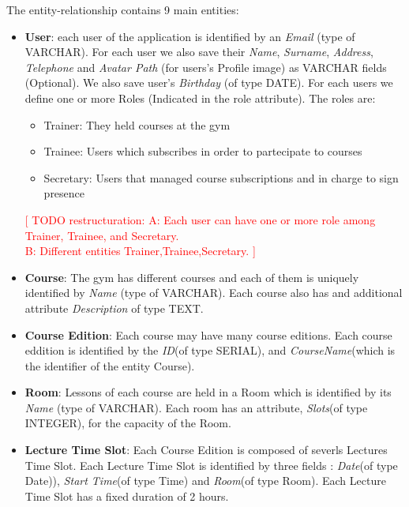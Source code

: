     The entity-relationship contains 9 main entities:
    \begin{itemize}
        \item 
        \textbf{User}: each user of the application is identified by an \textit{Email} (type of VARCHAR). 
    	For each user we also save their \textit{Name}, \textit{Surname}, \textit{Address}, \textit{Telephone} and \textit{Avatar Path} (for users's Profile image) as VARCHAR fields (Optional). We also save user's \textit{Birthday} (of type DATE). For each users we define
        one or more Roles (Indicated in the role attribute). The roles are:
        \begin{itemize}
	    \item Trainer: They held courses at the gym 
    	\item Trainee: Users which subscribes in order to partecipate to courses
        \item Secretary: Users that managed course subscriptions and in charge to sign presence
        
        \end{itemize}
    	\textcolor{red}{[ TODO restructuration: A: Each user can have one or more role among Trainer,  Trainee, and Secretary.\\
    	  B: Different entities Trainer,Trainee,Secretary. ]}
    	
    	\item 
    	\textbf{Course}: The gym has different courses and each of them is uniquely identified by 
    	\textit{Name} (type of VARCHAR). Each course also has and additional attribute \textit{Description} of type TEXT.
    	
    	\item 
    	\textbf{Course Edition}: Each course may have many course editions. Each course eddition is identified by the \textit{ID}(of type SERIAL), and \textit{CourseName}(which is the identifier of the entity Course).
    	
    	\item 
    	\textbf{Room}: Lessons of each course are held in a Room which is identified by its \textit{Name} (type of VARCHAR). Each room has an attribute, \textit{Slots}(of type INTEGER), for the capacity of the Room.
    	
    	\item \textbf{Lecture Time Slot}: Each Course Edition is composed of severls Lectures Time Slot. Each Lecture Time Slot is identified by three fields : \textit{Date}(of type Date)), \textit{Start Time}(of type Time) and \textit{Room}(of type Room). Each Lecture Time Slot has a fixed duration of 2 hours.
    	

\end{itemize}
